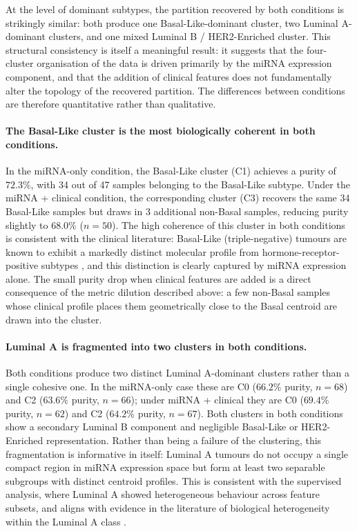 At the level of dominant subtypes, the partition recovered by both conditions is
strikingly similar: both produce one Basal-Like-dominant cluster, two Luminal A-dominant
clusters, and one mixed Luminal B / HER2-Enriched cluster. This structural consistency
is itself a meaningful result: it suggests that the four-cluster organisation of the
data is driven primarily by the miRNA expression component, and that the addition of
clinical features does not fundamentally alter the topology of the recovered partition.
The differences between conditions are therefore quantitative rather than qualitative.

\paragraph{The Basal-Like cluster is the most biologically coherent in both conditions.}
In the miRNA-only condition, the Basal-Like cluster (C1) achieves a purity of $72.3\%$,
with 34 out of 47 samples belonging to the Basal-Like subtype. Under the miRNA +
clinical condition, the corresponding cluster (C3) recovers the same 34 Basal-Like
samples but draws in 3 additional non-Basal samples, reducing purity slightly to $68.0\%$
($n=50$). The high coherence of this cluster in both conditions is consistent with the
clinical literature: Basal-Like (triple-negative) tumours are known to exhibit a
markedly distinct molecular profile from hormone-receptor-positive subtypes
\cite{bc_molecular_Perou2000}, and this distinction is clearly captured by miRNA expression
alone. The small purity drop when clinical features are added is a direct consequence
of the metric dilution described above: a few non-Basal samples whose clinical profile
places them geometrically close to the Basal centroid are drawn into the cluster.

\paragraph{Luminal A is fragmented into two clusters in both conditions.}
Both conditions produce two distinct Luminal A-dominant clusters rather than a single
cohesive one. In the miRNA-only case these are C0 ($66.2\%$ purity, $n=68$) and C2
($63.6\%$ purity, $n=66$); under miRNA + clinical they are C0 ($69.4\%$ purity,
$n=62$) and C2 ($64.2\%$ purity, $n=67$). Both clusters in both conditions show a
secondary Luminal B component and negligible Basal-Like or HER2-Enriched representation.
Rather than being a failure of the clustering, this fragmentation is informative in
itself: Luminal A tumours do not occupy a single compact region in miRNA expression space
but form at least two separable subgroups with distinct centroid profiles. This is
consistent with the supervised analysis, where Luminal A showed heterogeneous behaviour
across feature subsets, and aligns with evidence in the literature of biological
heterogeneity within the Luminal A class \cite{bc_molecular_Perou2000}.

